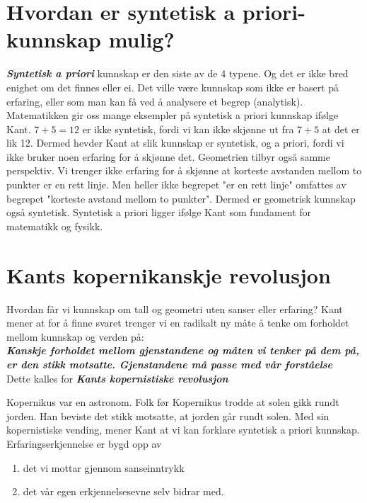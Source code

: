 \documentclass[11pt, a4paper]{article}
\begin{document}
\section{Hvordan er syntetisk a priori-kunnskap mulig?}

\textbf{\textit{Syntetisk a priori}} kunnskap er den siste av de 4 typene. Og det er ikke bred enighet om det finnes eller ei. Det ville være kunnskap som ikke er basert på erfaring, eller som man kan få ved å analysere et begrep (analytisk). \\

Matematikken gir oss mange eksempler på syntetisk a priori kunnskap ifølge Kant. $ 7+5=12 $ er ikke syntetisk, fordi vi kan ikke skjønne ut fra $ 7+5 $ at det er lik 12. Dermed hevder Kant at slik kunnskap er syntetisk, og a priori, fordi vi ikke bruker noen erfaring for å skjønne det. Geometrien tilbyr også samme perspektiv. Vi trenger ikke erfaring for å skjønne at korteste avstanden mellom to punkter er en rett linje. Men heller ikke begrepet "er en rett linje" omfattes av begrepet "korteste avstand mellom to punkter". Dermed er geometrisk kunnskap også syntetisk. Syntetisk a priori ligger ifølge Kant som fundament for matematikk og fysikk. 



\section{Kants kopernikanskje revolusjon}

Hvordan får vi kunnskap om tall og geometri uten sanser eller erfaring? Kant mener at for å finne svaret trenger vi en radikalt ny måte å tenke om forholdet mellom kunnskap og verden på: \\

\textbf{\textit{Kanskje forholdet mellom gjenstandene og måten vi tenker på dem på, er den stikk motsatte. Gjenstandene må passe med vår forståelse}}\\


Dette kalles for \textbf{\textit{Kants kopernistiske revolusjon}}

Kopernikus var en astronom. Folk før Kopernikus trodde at solen gikk rundt jorden. Han beviste det stikk motsatte, at jorden går rundt solen. Med sin kopernistiske vending, mener Kant at vi kan forklare syntetisk a priori kunnskap.\\


Erfaringserkjennelse er bygd opp av

\begin{enumerate}
    \item det vi mottar gjennom sanseinntrykk
    \item det vår egen erkjennelsesevne selv bidrar med.
\end{enumerate}
\end{document}
